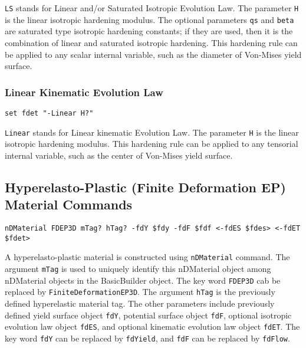 \texttt{LS}  stands  for  Linear  and/or Saturated Isotropic Evolution Law. 
The parameter \texttt{H} is the linear isotropic hardening modulus.
The optional parameters \texttt{qs} and \texttt{beta} are saturated type isotropic hardening constants;
if they are used, then it is the combination of linear and saturated isotropic hardening.   
This hardening rule can be applied  to  any scalar internal variable, 
such as the diameter of Von-Mises yield surface.

\subsubsection{Linear Kinematic Evolution Law} 
\label{fdLET}
\begin{verbatim}
set fdet "-Linear H?"
\end{verbatim}

\texttt{Linear}  stands for Linear kinematic Evolution Law. 
The parameter \texttt{H} is the linear isotropic hardening modulus. 
This hardening rule can be applied to any tensorial internal variable, 
such as the center of Von-Mises yield surface.

\subsection{Hyperelasto-Plastic (Finite Deformation EP) Material Commands}
\label{HEP_Command}

\begin{verbatim}
nDMaterial FDEP3D mTag? hTag? -fdY $fdy -fdF $fdf <-fdES $fdes> <-fdET $fdet> 
\end{verbatim}

A hyperelasto-plastic material is constructed using \texttt{nDMaterial} command.  
The  argument  \texttt{mTag} is used to uniquely  identify this nDMaterial object 
among nDMaterial objects  in  the  BasicBuilder  object. 
The key word \texttt{FDEP3D} cab be replaced by \texttt{FiniteDeformationEP3D}.  
The  argument  \texttt{hTag} is the previously defined hyperelastic material tag.
The  other  parameters include  previously  defined  yield surface object \texttt{fdY},
potential  surface  object  \texttt{fdF}, optional isotropic evolution law object \texttt{fdES},
and optional kinematic evolution law object \texttt{fdET}.
The key word \texttt{fdY} can be replaced by \texttt{fdYield}, 
and \texttt{fdF} can be replaced by \texttt{fdFlow}.


